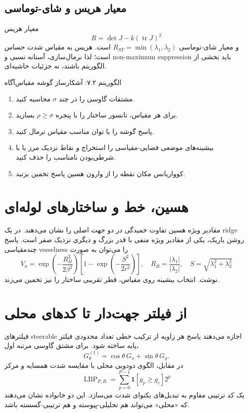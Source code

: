 \documentclass[12pt,openany,oneside]{book}
\begin{document}
\subsection{معیار هریس و شای-توماسی}
معیار هریس
\begin{equation}
R=\det J-k(\operatorname{tr}J)^2
\end{equation}
و معیار شای-توماسی \(R_{ST}=\min(\lambda_1,\lambda_2)\) است. هریس به مقیاس شدت حساس است؛ لذا نرمال‌سازی،
آستانه نسبی و non-maximum suppression باید بخشی از الگوریتم باشند، نه جزئیات حاشیه‌ای.

\begin{algorithmbox}{الگوریتم ۷.۲: آشکارساز گوشه مقیاس‌آگاه}
\begin{enumerate}
\item مشتقات گاوسی را در چند \(\sigma\) محاسبه کنید.
\item برای هر مقیاس، تانسور ساختار را با پنجره \(\rho\ge\sigma\) بسازید.
\item پاسخ گوشه را با توان مناسب مقیاس نرمال کنید.
\item بیشینه‌های موضعی فضایی-مقیاسی را استخراج و نقاط نزدیک مرز یا با شرطی‌بودن نامناسب را حذف کنید.
\item کوواریانس مکان نقطه را از وارون هسین پاسخ تخمین بزنید.
\end{enumerate}
\end{algorithmbox}

\section{هسین، خط و ساختارهای لوله‌ای}
مقادیر ویژه هسین تفاوت خمیدگی در دو جهت اصلی را نشان می‌دهند. در یک ridge روشن باریک، یکی از مقادیر ویژه
منفی با قدر بزرگ و دیگری نزدیک صفر است. پاسخ چندمقیاسی vesselness را می‌توان به صورت
\begin{equation}
V_\sigma=\exp\!\left(-\frac{R_B^2}{2\beta^2}\right)
\left[1-\exp\!\left(-\frac{S^2}{2c^2}\right)\right],
\quad R_B=\frac{|\lambda_1|}{|\lambda_2|},\quad S=\sqrt{\lambda_1^2+\lambda_2^2}
\end{equation}
نوشت. انتخاب بیشینه روی مقیاس، قطر تقریبی ساختار را نیز تخمین می‌زند.

\section{از فیلتر جهت‌دار تا کدهای محلی}
فیلترهای steerable اجازه می‌دهند پاسخ هر زاویه از ترکیب خطی تعداد محدودی فیلتر پایه ساخته شود. برای مشتق
گاوسی مرتبه اول،
\begin{equation}
G_\theta^{(1)}=\cos\theta\,G_x+\sin\theta\,G_y.
\end{equation}
در مقابل، الگوی دودویی محلی با مقایسه شدت همسایه و مرکز
\begin{equation}
\operatorname{LBP}_{P,R}=\sum_{p=0}^{P-1}\mathbf 1[g_p\ge g_c]2^p
\end{equation}
یک کد ترتیبی مقاوم به تبدیل‌های یکنوای شدت می‌سازد. این دو خانواده نشان می‌دهند که «محلی» می‌تواند هم
تحلیلی-پیوسته و هم ترتیبی-گسسته باشد.
\end{document}
